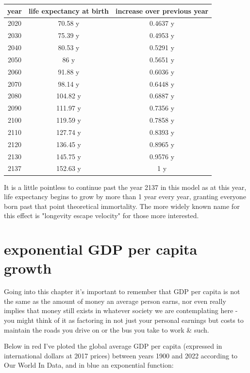 \documentclass[a4paper]{article}
\begin{document}
	\begin{center}
		\begin{tabular}{c | c | c }
			year & life expectancy at birth & increase over previous year \\\hline
			2020 & 70.58 y & 0.4637 y \\\hline
			2030 & 75.39 y & 0.4953 y \\\hline
			2040 & 80.53 y & 0.5291 y \\\hline
			2050 & 86 y & 0.5651 y \\\hline
			2060 & 91.88 y & 0.6036 y \\\hline
			2070 & 98.14 y & 0.6448 y \\\hline
			2080 & 104.82 y & 0.6887 y \\\hline
			2090 & 111.97 y & 0.7356 y \\\hline
			2100 & 119.59 y & 0.7858 y \\\hline
			2110 & 127.74 y & 0.8393 y \\\hline
			2120 & 136.45 y & 0.8965 y \\\hline
			2130 & 145.75 y & 0.9576 y \\\hline
			2137 & 152.63 y & 1 y \\
		\end{tabular}
	\end{center}
	
	It is a little pointless to continue past the year 2137 in this model as at this year, life expectancy begins to grow by more than 1 year every year, granting everyone born past that point theoretical immortality. The more widely known name for this effect is "longevity escape velocity" for those more interested.
	
	\pagebreak
	
	\section{exponential GDP per capita growth}
	
	Going into this chapter it's important to remember that GDP per capita is not the same as the amount of money an average person earns, nor even really implies that money still exists in whatever society we are contemplating here - you might think of it as factoring in not just your personal earnings but costs to maintain the roads you drive on or the bus you take to work \& such.
	
	\medskip
	
	Below in red I've ploted the global average GDP per capita (expressed in international dollars at 2017 prices) between years 1900 and 2022 according to Our World In Data, and in blue an exponential function:
	
\end{document}
